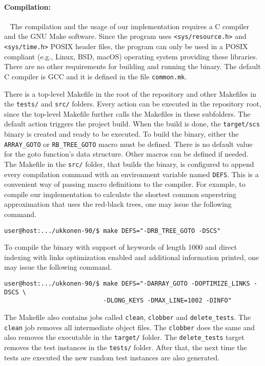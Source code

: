 \documentclass[english,twoside,censored,csm,algorithms-track-2020]{HYthesisML}
\theoremstyle{plain}
\theoremstyle{definition}
\begin{document}

\paragraph{Compilation:}~\label{usage}
The compilation and the usage of our implementation requires a C compiler and the GNU Make software.
Since the program uses \texttt{<sys/resource.h>} and \texttt{<sys/time.h>} POSIX header files,
the program can only
be used in a POSIX compliant (e.g., Linux, BSD, macOS) operating system providing these libraries.
There are no other
requirements for building and running the binary. The default C compiler is GCC and it is defined in the
file \texttt{common.mk}.

There is a top-level Makefile in the root of the repository and other Makefiles in the \texttt{tests/}
and \texttt{src/} folders. Every action can be executed in the repository root, since the top-level
Makefile further calls the Makefiles in these subfolders. The default action triggers the project build.
When the build is done, the \texttt{target/scs} binary is created and ready to be executed. To build
the binary, either the \texttt{ARRAY\_GOTO} or \texttt{RB\_TREE\_GOTO} macro must be defined.
There is no default value
for the goto function's data structure. Other macros can be defined if needed.
The Makefile in the \texttt{src/} folder, that builds the binary, is configured to append every
compilation command with an environment variable named \texttt{DEFS}. This is a convenient way of passing
macro definitions to the compiler. For example, to compile our implementation to calculate the
shortest common superstring approximation that uses the red-black trees, one may issue the following
command.

\begin{verbatim}
user@host:.../ukkonen-90/$ make DEFS="-DRB_TREE_GOTO -DSCS"
\end{verbatim}

To compile the binary with support of keywords of length 1000 and direct indexing with links
optimization enabled and additional information printed, one may issue the following command.

\begin{verbatim}
user@host:.../ukkonen-90/$ make DEFS="-DARRAY_GOTO -DOPTIMIZE_LINKS -DSCS \
                           -DLONG_KEYS -DMAX_LINE=1002 -DINFO"
\end{verbatim}

The Makefile also contains jobs called \texttt{clean}, \texttt{clobber} and \texttt{delete\_tests}.
The \texttt{clean} job removes all
intermediate object files. The \texttt{clobber} does the same and also removes the executable in the
\texttt{target/} folder. The \texttt{delete\_tests} target removes the test instances in the
\texttt{tests/}
folder. After that, the next time the tests are executed the new random test instances are
also generated.
\end{document}

